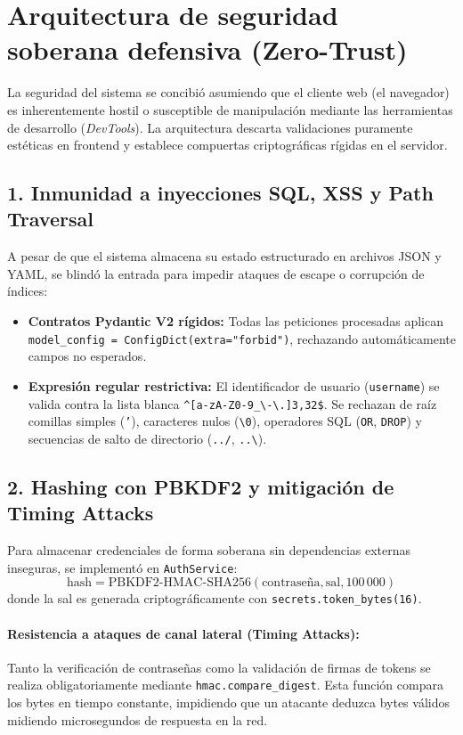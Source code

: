 \documentclass[11pt,a4paper]{article}
\begin{document}
\section{Arquitectura de seguridad soberana defensiva (Zero-Trust)}

La seguridad del sistema se concibi\'o asumiendo que el cliente web (el navegador) es inherentemente hostil o susceptible de manipulaci\'on mediante las herramientas de desarrollo (\textit{DevTools}). La arquitectura descarta validaciones puramente est\'eticas en frontend y establece compuertas criptogr\'aficas r\'igidas en el servidor.

\subsection{1. Inmunidad a inyecciones SQL, XSS y Path Traversal}
A pesar de que el sistema almacena su estado estructurado en archivos JSON y YAML, se blind\'o la entrada para impedir ataques de escape o corrupci\'on de \'indices:
\begin{itemize}[leftmargin=*]
    \item \textbf{Contratos Pydantic V2 r\'igidos:} Todas las peticiones procesadas aplican \texttt{model\_config = ConfigDict(extra="forbid")}, rechazando autom\'aticamente campos no esperados.
    \item \textbf{Expresi\'on regular restrictiva:} El identificador de usuario (\texttt{username}) se valida contra la lista blanca \texttt{\textasciicircum[a-zA-Z0-9\_\textbackslash-\textbackslash.]{3,32}\$}. Se rechazan de ra\'iz comillas simples (\texttt{'}), caracteres nulos (\texttt{\textbackslash0}), operadores SQL (\texttt{OR}, \texttt{DROP}) y secuencias de salto de directorio (\texttt{../}, \texttt{..\textbackslash}).
\end{itemize}

\subsection{2. Hashing con PBKDF2 y mitigaci\'on de Timing Attacks}
Para almacenar credenciales de forma soberana sin dependencias externas inseguras, se implement\'o en \texttt{AuthService}:
\begin{equation}
    \text{hash} = \text{PBKDF2-HMAC-SHA256}(\text{contrase\~na}, \text{sal}, 100\,000)
\end{equation}
donde la sal es generada criptogr\'aficamente con \texttt{secrets.token\_bytes(16)}.

\paragraph{Resistencia a ataques de canal lateral (Timing Attacks):}
Tanto la verificaci\'on de contrase\~nas como la validaci\'on de firmas de tokens se realiza obligatoriamente mediante \texttt{hmac.compare\_digest}. Esta funci\'on compara los bytes en tiempo constante, impidiendo que un atacante deduzca bytes v\'alidos midiendo microsegundos de respuesta en la red.
\end{document}
